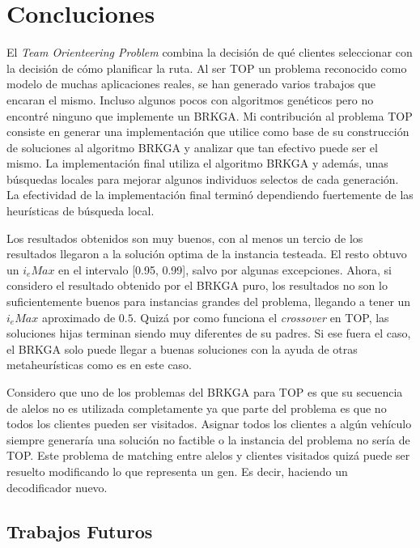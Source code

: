 \chapter{Concluciones}

\bigskip

El \textit{Team Orienteering Problem} combina la decisión de qué clientes seleccionar con la decisión de cómo planificar la ruta. Al ser TOP un problema reconocido como modelo de muchas aplicaciones reales, se han generado varios trabajos que encaran el mismo. Incluso algunos pocos con algoritmos genéticos pero no encontré ninguno que implemente un BRKGA. Mi contribución al problema TOP consiste en generar una implementación que utilice como base de su construcción de soluciones al algoritmo BRKGA y analizar que tan efectivo puede ser el mismo. La implementación final utiliza el algoritmo BRKGA y además, unas búsquedas locales para mejorar algunos individuos selectos de cada generación. La efectividad de la implementación final terminó dependiendo fuertemente de las heurísticas de búsqueda local.

\bigskip

Los resultados obtenidos son muy buenos, con al menos un tercio de los resultados llegaron a la solución optima de la instancia testeada. El resto obtuvo un $i_eMax$ en el intervalo [0.95, 0.99], salvo por algunas excepciones. Ahora, si considero el resultado obtenido por el BRKGA puro, los resultados no son lo suficientemente buenos para instancias grandes del problema, llegando a tener un $i_eMax$ aproximado de $0.5$. Quizá por como funciona el \textit{crossover} en TOP, las soluciones hijas terminan siendo muy diferentes de su padres. Si ese fuera el caso, el BRKGA solo puede llegar a buenas soluciones con la ayuda de otras metaheurísticas como es en este caso.

\bigskip

Considero que uno de los problemas del BRKGA para TOP es que su secuencia de alelos no es utilizada completamente ya que parte del problema es que no todos los clientes pueden ser visitados. Asignar todos los clientes a algún vehículo siempre generaría una solución no factible o la instancia del problema no sería de TOP. Este problema de matching entre alelos y clientes visitados quizá puede ser resuelto modificando lo que representa un gen. Es decir, haciendo un decodificador nuevo.

\section{Trabajos Futuros}

